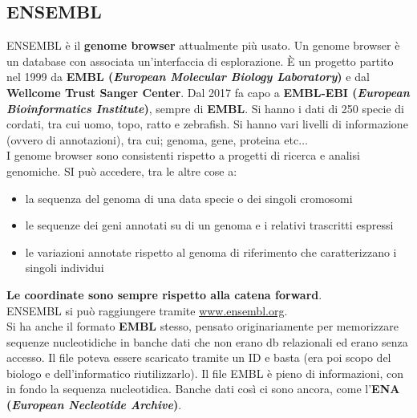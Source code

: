 \documentclass[a4paper,12pt, oneside]{book}
\begin{document}
\subsection{ENSEMBL}
ENSEMBL è il \textbf{genome browser} attualmente più usato. Un genome browser è
un database con associata un'interfaccia di esplorazione. È un progetto partito
nel 1999 da \textbf{EMBL (\textit{European Molecular Biology Laboratory})} e dal
\textbf{Wellcome Trust Sanger Center}. Dal 2017 fa capo a 
\textbf{EMBL-EBI (\textit{European Bioinformatics Institute})}, sempre di
\textbf{EMBL}. Si hanno i dati di 250 specie di cordati, tra cui uomo, topo,
ratto e 
zebrafish. Si hanno vari livelli di informazione (ovvero di annotazioni), tra
cui; genoma, gene, proteina etc$\ldots$\\
I genome browser sono consistenti rispetto a progetti di ricerca e
analisi genomiche. SI può accedere, tra le altre cose a:
\begin{itemize}
  \item la sequenza del genoma di una data specie o dei singoli cromosomi
  \item le sequenze dei geni annotati su di un genoma e i relativi trascritti
  espressi
  \item le variazioni annotate rispetto al genoma di riferimento che
  caratterizzano i singoli individui  
\end{itemize}
\textbf{Le coordinate sono sempre rispetto alla catena forward}.\\
ENSEMBL si può raggiungere tramite \url{www.ensembl.org}.\\
Si ha anche il formato \textbf{EMBL} stesso, pensato originariamente per
memorizzare sequenze 
nucleotidiche in banche dati che non erano db relazionali ed erano senza
accesso. Il file poteva essere scaricato tramite un ID e basta (era poi scopo
del biologo e dell'informatico riutilizzarlo). Il file EMBL è pieno di
informazioni, con in fondo la sequenza nucleotidica. Banche dati così ci sono
ancora, come l'\textbf{ENA (\textit{European Necleotide Archive})}.
\end{document}
